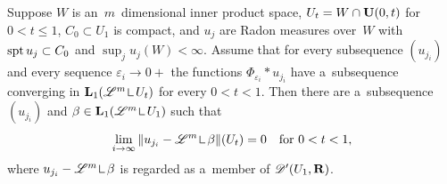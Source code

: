 \documentclass[a4paper,twoside,leqno]{article}
\begin{document}
\begin{lemma}[new]
    \label{new:mollcompact}
    Suppose $W$ is an~$m$~dimensional inner product space, $U_t = W \cap \mathbf{U}(0,t)$ for $0 < t
    \le 1$, $C_0 \subset U_1$ is compact, and $u_j$ are Radon measures over~$W$ with $\operatorname{spt} u_j
    \subset C_0$ and $\sup_j u_j(W) < \infty$. Assume that for every subsequence $(u_{j_i})$ and
    every sequence $\varepsilon_i \to 0+$ the functions $\Phi_{\varepsilon_i} * u_{j_i}$ have
    a~subsequence converging in $\Lp{1}(\LM^m \restrict U_t)$ for every $0 < t < 1$. Then there are
    a~subsequence $(u_{j_i})$ and $\beta \in \Lp{1}(\LM^m \restrict U_1)$ such that
    \begin{displaymath}
        \lim_{i \to \infty} \|u_{j_i} - \LM^m \restrict \beta\|(U_t) = 0 \quad \text{for $0 < t <
        1$},
    \end{displaymath}
    where $u_{j_i} - \LM^m \restrict \beta$ is regarded as a~member of $\mathscr{D}'(U_1,\mathbf{R})$.
\end{lemma}
\end{document}
